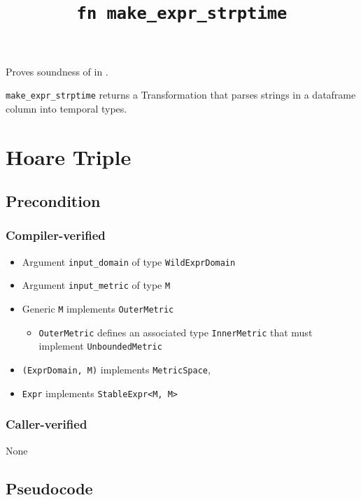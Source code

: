 \documentclass{article}
\title{\texttt{fn make\_expr\_strptime}}
\author{\MichaelShoemateAuthor}
\date{}
\begin{document}
\maketitle

\contrib
Proves soundness of  in .

\texttt{make\_expr\_strptime} returns a Transformation that parses strings in a dataframe column into temporal types.

\section{Hoare Triple}
\subsection*{Precondition}
\subsubsection*{Compiler-verified}
\begin{itemize}
    \item Argument \texttt{input\_domain} of type \texttt{WildExprDomain}
    \item Argument \texttt{input\_metric} of type \texttt{M}
    \item Generic \texttt{M} implements \texttt{OuterMetric}
    \begin{itemize}
        \item \texttt{OuterMetric} defines an associated type \texttt{InnerMetric} that must implement \texttt{UnboundedMetric}
    \end{itemize}
    \item \texttt{(ExprDomain, M)} implements \texttt{MetricSpace},
    \item \texttt{Expr} implements \texttt{StableExpr<M, M>}
\end{itemize}

\subsubsection*{Caller-verified}
None

\subsection*{Pseudocode}

\end{document}

